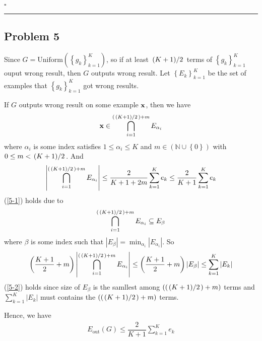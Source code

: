 \documentclass[12pt]{article}
\newcommand*{\QEDB}{\hfill\ensuremath{\square}}
\newcommand{\CBrackets}[1]{\left\{#1\right\}}
\newcommand{\ParTh}[1]{\left(#1\right)}
\newcommand{\BF}[1]{{\bf#1}}
\newcommand{\AbsVal}[1]{\left|#1\right|}
\newcommand{\Divide}[2]{\left.#1\middle/#2\right.}
\newcommand{\horrule}[1]{\rule{\linewidth}{#1}}
\begin{document}
\QEDB

\horrule{0.5pt}

\subsection*{Problem 5}

Since $G=\text{Uniform}\ParTh{\CBrackets{g_k}^K_{k=1}}$, so if at least $\Divide{\ParTh{K+1}}{2}$ terms of $\CBrackets{g_k}^K_{k=1}$ ouput wrong result, then $G$ outputs wrong result. Let $\CBrackets{E_k}^K_{k=1}$ be the set of examples that $\CBrackets{g_k}^K_{k=1}$ got wrong results.

If $G$ outputs wrong result on some example $\BF{x}$, then we have
\begin{align}
\BF{x}\in\bigcap^{\ParTh{\Divide{\ParTh{K+1}}{2}}+m}_{i=1}E_{\alpha_i}
\end{align}
where $\alpha_i$ is some index satisfies $1\leq\alpha_i\leq K$ and $m\in\ParTh{\mathbb{N}\cup\CBrackets{0}}$ with $0\leq m<\Divide{\ParTh{K+1}}{2}$. And
\begin{align}
\AbsVal{\bigcap^{\ParTh{\Divide{\ParTh{K+1}}{2}}+m}_{i=1}E_{\alpha_i}}\leq\dfrac{2}{K+1+2m}\sum_{k=1}^{K}e_k\leq\dfrac{2}{K+1}\sum_{k=1}^{K}e_k
\label{5-1}
\end{align}
(\ref{5-1}) holds due to %
\begin{align}
\bigcap^{\ParTh{\Divide{\ParTh{K+1}}{2}}+m}_{i=1}E_{\alpha_i}\subseteq E_{\beta}
\end{align}
where $\beta$ is some index such that $\AbsVal{E_{\beta}}=\min_{\alpha_i}\AbsVal{E_{\alpha_i}}$. So
\begin{align}
\ParTh{\dfrac{K+1}{2}+m}\AbsVal{\bigcap^{\ParTh{\Divide{\ParTh{K+1}}{2}}+m}_{i=1}E_{\alpha_i}}\leq\ParTh{\dfrac{K+1}{2}+m}\AbsVal{E_{\beta}}\leq\sum_{k=1}^{K}\AbsVal{E_k}
\label{5-2}
\end{align}
(\ref{5-2}) holds since size of $E_\beta$ is the samllest among $\ParTh{\ParTh{\Divide{\ParTh{K+1}}{2}}+m}$ terms and $\sum_{k=1}^{K}\AbsVal{E_k}$ must contains the $\ParTh{\ParTh{\Divide{\ParTh{K+1}}{2}}+m}$ terms.

Hence, we have
\begin{align}
E_{\text{out}}\ParTh{G}\leq\dfrac{2}{K+1}\sum_{k=1}^{K}e_k
\end{align}
\begin{comment}
\begin{align}
\dfrac{2}{M+1}\sum_{k=1}^{M}e_k\leq\dfrac{2}{M+3}\sum_{k=1}^{M+2}e_k=\dfrac{2}{M+3}\ParTh{\sum_{k=1}^{M}e_k+e_{M+1}+e_{M+2}}
\end{align}
\begin{align}
\dfrac{4}{\ParTh{M+1}\ParTh{M+3}}\sum_{k=1}^{M}e_k-e_{M+1}-e_{M+2}
\end{align}
\end{comment}
\end{document}
